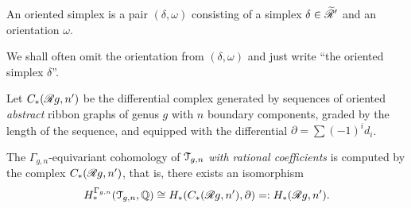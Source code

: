 \begin{definition}
  An oriented simplex is a pair $(\delta, \omega)$ consisting of a simplex $\delta \in
  \mathscr{\widetilde R}_{}'$ and an orientation $\omega$.
\end{definition}
We shall often omit the orientation from $(\delta, \omega)$ and just write ``the
oriented simplex $\delta$''.

\begin{lemma}
  \label{lemma:rg-iso1}
  Let $C_*(\mathscr{R}_{}{g,n}')$ be the differential complex generated by
  sequences of oriented \emph{abstract} ribbon graphs of genus $g$
  with $n$ boundary components, graded by the length of the sequence,
  and equipped with the differential $\partial = \sum (-1)^id_i$.

  The $\Gamma_{g,n}$-equivariant cohomology of $\mathcal{T}_{g,n}$ \emph{with
    rational coefficients} is computed by the complex $C_*(\mathscr{R}_{}{g,n}')$,
  that is, there exists an isomorphism
  \begin{equation*}
    H^{\Gamma_{g,n}}_*(\mathcal{T}_{g,n}, \mathbb{Q}) \cong H_*(C_*(\mathscr{R}_{}{g,n}'), \partial) =: H_*(\mathscr{R}_{}{g,n}').
  \end{equation*}
\end{lemma}
